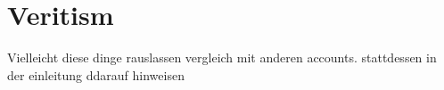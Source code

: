 \documentclass[12pt,numbers=noenddot]{scrartcl}
\begin{document}

\clearpage

\section{Veritism}


Vielleicht diese dinge rauslassen vergleich mit anderen accounts. stattdessen in der einleitung ddarauf hinweisen
\end{document}
